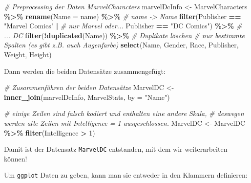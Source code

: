 \documentclass[
  ngerman,
]{book}
\newenvironment{Shaded}{\begin{snugshade}}{\end{snugshade}}
\newcommand{\AttributeTok}[1]{\textcolor[rgb]{0.13,0.29,0.53}{#1}}
\newcommand{\CommentTok}[1]{\textcolor[rgb]{0.56,0.35,0.01}{\textit{#1}}}
\newcommand{\DecValTok}[1]{\textcolor[rgb]{0.00,0.00,0.81}{#1}}
\newcommand{\FunctionTok}[1]{\textcolor[rgb]{0.13,0.29,0.53}{\textbf{#1}}}
\newcommand{\NormalTok}[1]{#1}
\newcommand{\OtherTok}[1]{\textcolor[rgb]{0.56,0.35,0.01}{#1}}
\newcommand{\SpecialCharTok}[1]{\textcolor[rgb]{0.81,0.36,0.00}{\textbf{#1}}}
\newcommand{\StringTok}[1]{\textcolor[rgb]{0.31,0.60,0.02}{#1}}
\begin{document}
\begin{Shaded}
\begin{Highlighting}[]
\CommentTok{\# Preprocessing der Daten \textasciigrave{}MarvelCharacters\textasciigrave{}}
\NormalTok{marvelDcInfo }\OtherTok{\textless{}{-}}\NormalTok{ MarvelCharacters }\SpecialCharTok{\%\textgreater{}\%}
  \FunctionTok{rename}\NormalTok{(}\AttributeTok{Name =}\NormalTok{ name) }\SpecialCharTok{\%\textgreater{}\%}                  \CommentTok{\# \textasciigrave{}name\textasciigrave{} {-}\textgreater{} \textasciigrave{}Name\textasciigrave{}}
  \FunctionTok{filter}\NormalTok{(Publisher }\SpecialCharTok{==} \StringTok{"Marvel Comics"} \SpecialCharTok{|}    \CommentTok{\# nur Marvel oder... }
\NormalTok{           Publisher }\SpecialCharTok{==} \StringTok{"DC Comics"}\NormalTok{)  }\SpecialCharTok{\%\textgreater{}\%}  \CommentTok{\# ... DC}
  \FunctionTok{filter}\NormalTok{(}\SpecialCharTok{!}\FunctionTok{duplicated}\NormalTok{(Name)) }\SpecialCharTok{\%\textgreater{}\%}            \CommentTok{\# Duplikate löschen}
  \CommentTok{\# nur bestimmte Spalten (es gibt z.B. auch Augenfarbe)}
  \FunctionTok{select}\NormalTok{(Name, Gender, Race, Publisher, Weight, Height) }
\end{Highlighting}
\end{Shaded}

Dann werden die beiden Datensätze zusammengefügt:

\begin{Shaded}
\begin{Highlighting}[]
\CommentTok{\# Zusammenführen der beiden Datensätze}
\NormalTok{MarvelDC }\OtherTok{\textless{}{-}} \FunctionTok{inner\_join}\NormalTok{(marvelDcInfo, MarvelStats, }\AttributeTok{by =} \StringTok{"Name"}\NormalTok{)}

\CommentTok{\# einige Zeilen sind falsch kodiert und enthalten eine andere Skala,}
\CommentTok{\# deswegen werden alle Zeilen mit Intelligence = 1 ausgeschlossen. }
\NormalTok{MarvelDC }\OtherTok{\textless{}{-}}\NormalTok{ MarvelDC }\SpecialCharTok{\%\textgreater{}\%} 
  \FunctionTok{filter}\NormalTok{(Intelligence }\SpecialCharTok{\textgreater{}} \DecValTok{1}\NormalTok{) }
\end{Highlighting}
\end{Shaded}

Damit ist der Datensatz \texttt{MarvelDC} entstanden, mit dem wir weiterarbeiten können!

Um \texttt{ggplot} {Daten} zu geben, kann man sie entweder in den Klammern definieren:
\end{document}
